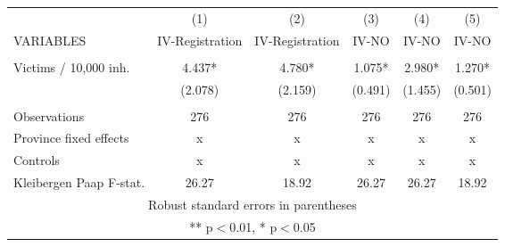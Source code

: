 \begin{tabular}{lccccc} \hline
 & (1) & (2) & (3) & (4) & (5) \\
VARIABLES & IV-Registration & IV-Registration & IV-NO & IV-NO & IV-NO \\ \hline
 &  &  &  &  &  \\
Victims / 10,000 inh. & 4.437* & 4.780* & 1.075* & 2.980* & 1.270* \\
 & (2.078) & (2.159) & (0.491) & (1.455) & (0.501) \\
 &  &  &  &  &  \\
Observations & 276 & 276 & 276 & 276 & 276 \\
Province fixed effects & x & x & x & x & x \\
Controls & x & x & x & x & x \\
 Kleibergen Paap F-stat. & 26.27 & 18.92 & 26.27 & 26.27 & 18.92 \\ \hline
\multicolumn{6}{c}{ Robust standard errors in parentheses} \\
\multicolumn{6}{c}{ ** p$<$0.01, * p$<$0.05} \\
\end{tabular}

